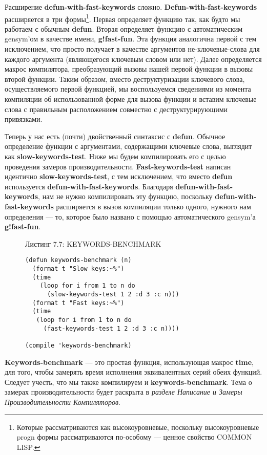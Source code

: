Расширение \textbf{defun-with-fast-keywords} сложно. \textbf{Defun-with-fast-\-key\-words} расширяется в три формы\footnote{Которые рассматриваются как высокоуровневые, поскольку высокоуровневые progn формы рассматриваются по-особому --- ценное свойство COMMON LISP.}. Первая определяет функцию так, как будто мы работаем с обычным \textbf{defun}. Вторая определяет функцию с автоматическим gensym'ом в качестве имени, \textbf{g!fast-fun}. Эта функция аналогична первой с тем исключением, что просто получает в качестве аргументов не-ключевые-слова для каждого аргумента (являющегося ключевым словом или нет). Далее определяется макрос компилятора, преобразующий вызовы нашей первой функции в вызовы второй функции. Таким образом, вместо деструктуризации ключевого слова, осуществляемого первой функцией, мы воспользуемся сведениями из момента компиляции об использованной форме для вызова функции и вставим ключевые слова с правильным расположением совместно с деструктурирующими привязками.

Теперь у нас есть (почти) двойственный синтаксис с \textbf{defun}. Обычное определение функции с аргументами, содержащими ключевые слова, выглядит как \textbf{slow-keywords-test}. Ниже мы будем компилировать его с целью проведения замеров производительности. \textbf{Fast-keywords-test} написан идентично \textbf{slow-keywords-test}, с тем исключением, что вместо \textbf{defun} используется \textbf{defun-with-fast-keywords}. Благодаря \textbf{defun-with-fast-keywords}, нам не нужно компилировать эту функцию, поскольку \textbf{defun-with-fast-keywords} расширяется в вызов компиляции только одного, нужного нам определения --- то, которое было названо с помощью автоматического gensym'а \textbf{g!fast-fun}.

\begin{figure}Листинг 7.7: KEYWORDS-BENCHMARK\label{listing_7.7}
\listbegin
\begin{verbatim}
(defun keywords-benchmark (n)
  (format t "Slow keys:~%")
  (time
    (loop for i from 1 to n do
      (slow-keywords-test 1 2 :d 3 :c n)))
  (format t "Fast keys:~%")
  (time
   (loop for i from 1 to n do
     (fast-keywords-test 1 2 :d 3 :c n))))

(compile 'keywords-benchmark)
\end{verbatim}
\listend
\end{figure}

\textbf{Keywords-benchmark} --- это простая функция, использующая макрос \textbf{time}, для того, чтобы замерять время исполнения эквивалентных серий обеих функций. Следует учесть, что мы также компилируем и \textbf{keywords-benchmark}. Тема о замерах производительности будет раскрыта в \emph{разделе Написание и Замеры Производительности Компиляторов}.

